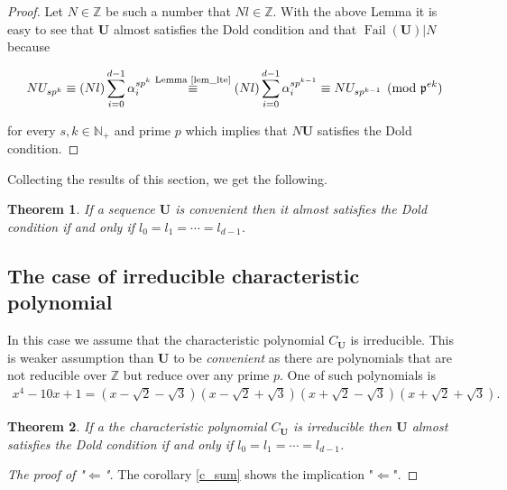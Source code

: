 \documentclass[preprint,12pt]{elsarticle}
\newcommand{\N}{\mathbb{N}}
\newcommand{\Z}{\mathbb{Z}}
\newcommand{\nice}{\textit{convenient} }
\newcommand{\pp}{\mathfrak{p} }
\DeclareMathOperator{\fail}{Fail}
\newtheorem{theorem}{Theorem}
\begin{document}
\begin{proof}
    Let $N\in\Z$ be such a number that $Nl\in\Z$. With the above Lemma it is easy to see that $\mathbf{U}$ almost satisfies the Dold condition and that $\fail(\mathbf{U})|N$ because

\begin{align}
    N{U}_{sp^k} \equiv 
    (Nl)\sum_{i=0}^{d-1}\alpha_i^{sp^k}  \overset{\text{Lemma \ref{lem_lte}}}{\equiv}
    (Nl)\sum_{i=0}^{d-1}\alpha_i^{sp^{k-1}}  \equiv
    N{U}_{sp^{k-1}}  \pmod { \pp^{ek}}
\end{align}

for every $s,k\in \N_+$ and prime $p$ which implies that $N\mathbf{U}$ satisfies the Dold condition.  

\end{proof}

Collecting the results of this section, we get the following.

\begin{theorem}\label{the_nice}
    If a sequence $\mathbf{U}$ is \nice then it almost satisfies the Dold condition if and only if $l_0 = l_1 = \cdots = l_{d-1}$.
\end{theorem}













\subsection{The case of irreducible characteristic polynomial}

 In this case we assume that the characteristic polynomial $C_\mathbf{U}$ is irreducible. This is weaker assumption than $\textbf{U}$ to be \nice as there are polynomials that are not reducible over $\Z$ but reduce over any prime $p$. One of such polynomials is
 \begin{align}
     x^4-10x+1 = (x-\sqrt{2}-\sqrt{3})(x-\sqrt{2}+\sqrt{3})(x+\sqrt{2}-\sqrt{3})(x+\sqrt{2}+\sqrt{3}).
 \end{align}



\begin{theorem}\label{the_part}
    If a the characteristic polynomial $C_\mathbf{U}$ is irreducible then $\mathbf{U}$ almost satisfies the Dold condition if and only if $l_0 = l_1 = \cdots = l_{d-1}$.
\end{theorem}
\begin{proof}[The proof of "$\Leftarrow$"]
    The corollary \ref{c_sum} shows the implication "$\Leftarrow$". 
\end{proof}
\end{document}
